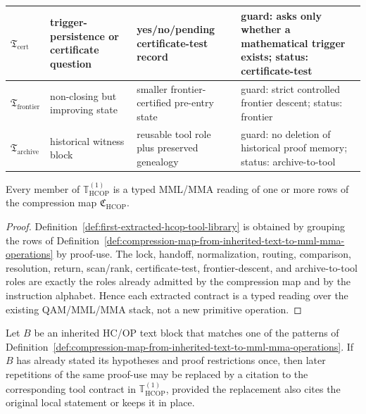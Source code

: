 \begin{definition}
{\begin{longtable}{|P{0.18\textwidth}|P{0.22\textwidth}|P{0.22\textwidth}|P{0.26\textwidth}|}
\hline
\(\mathfrak T_{\mathrm{cert}}\) & trigger-persistence or certificate question & yes/no/pending certificate-test record & guard: asks only whether a mathematical trigger exists; status: certificate-test \\
\hline
\(\mathfrak T_{\mathrm{frontier}}\) & non-closing but improving state & smaller frontier-certified pre-entry state & guard: strict controlled frontier descent; status: frontier \\
\hline
\(\mathfrak T_{\mathrm{archive}}\) & historical witness block & reusable tool role plus preserved genealogy & guard: no deletion of historical proof memory; status: archive-to-tool \\
\hline
\end{longtable}
}
\end{definition}

\begin{lemma}
\label{lem:extracted-tool-contracts-are-typed-mml-mma-readings}
Every member of \(\mathbb T_{\mathrm{HCOP}}^{(1)}\) is a typed MML/MMA reading of one or more rows of the compression map \(\mathfrak C_{\mathrm{HCOP}}\).
\end{lemma}

\begin{proof}
Definition~\ref{def:first-extracted-hcop-tool-library} is obtained by grouping the rows of Definition~\ref{def:compression-map-from-inherited-text-to-mml-mma-operations} by proof-use. The lock, handoff, normalization, routing, comparison, resolution, return, scan/rank, certificate-test, frontier-descent, and archive-to-tool roles are exactly the roles already admitted by the compression map and by the instruction alphabet. Hence each extracted contract is a typed reading over the existing QAM/MML/MMA stack, not a new primitive operation.
\end{proof}

\begin{proposition}
\label{prop:immediate-simplification-rule-for-inherited-hcop-prose}
Let \(B\) be an inherited HC/OP text block that matches one of the patterns of Definition~\ref{def:compression-map-from-inherited-text-to-mml-mma-operations}. If \(B\) has already stated its hypotheses and proof restrictions once, then later repetitions of the same proof-use may be replaced by a citation to the corresponding tool contract in \(\mathbb T_{\mathrm{HCOP}}^{(1)}\), provided the replacement also cites the original local statement or keeps it in place.
\end{proposition}

